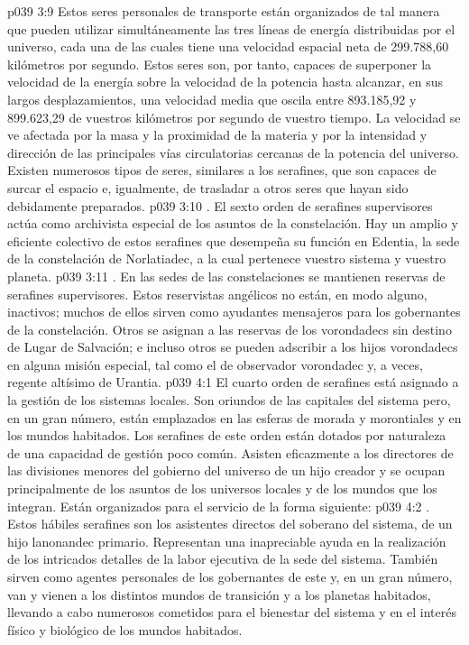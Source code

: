 \vs p039 3:9 Estos seres personales de transporte están organizados de tal manera que pueden utilizar simultáneamente las tres líneas de energía distribuidas por el universo, cada una de las cuales tiene una velocidad espacial neta de 299.788,60 kilómetros por segundo. Estos seres son, por tanto, capaces de superponer la velocidad de la energía sobre la velocidad de la potencia hasta alcanzar, en sus largos desplazamientos, una velocidad media que oscila entre 893.185,92 y 899.623,29 de vuestros kilómetros por segundo de vuestro tiempo. La velocidad se ve afectada por la masa y la proximidad de la materia y por la intensidad y dirección de las principales vías circulatorias cercanas de la potencia del universo. Existen numerosos tipos de seres, similares a los serafines, que son capaces de surcar el espacio e, igualmente, de trasladar a otros seres que hayan sido debidamente preparados.
\vs p039 3:10 . El sexto orden de serafines supervisores actúa como archivista especial de los asuntos de la constelación. Hay un amplio y eficiente colectivo de estos serafines que desempeña su función en Edentia, la sede de la constelación de Norlatiadec, a la cual pertenece vuestro sistema y vuestro planeta.
\vs p039 3:11 . En las sedes de las constelaciones se mantienen reservas de serafines supervisores. Estos reservistas angélicos no están, en modo alguno, inactivos; muchos de ellos sirven como ayudantes mensajeros para los gobernantes de la constelación. Otros se asignan a las reservas de los vorondadecs sin destino de Lugar de Salvación; e incluso otros se pueden adscribir a los hijos vorondadecs en alguna misión especial, tal como el de observador vorondadec y, a veces, regente altísimo de Urantia.
\vs p039 4:1 El cuarto orden de serafines está asignado a la gestión de los sistemas locales. Son oriundos de las capitales del sistema pero, en un gran número, están emplazados en las esferas de morada y morontiales y en los mundos habitados. Los serafines de este orden están dotados por naturaleza de una capacidad de gestión poco común. Asisten eficazmente a los directores de las divisiones menores del gobierno del universo de un hijo creador y se ocupan principalmente de los asuntos de los universos locales y de los mundos que los integran. Están organizados para el servicio de la forma siguiente:
\vs p039 4:2 . Estos hábiles serafines son los asistentes directos del soberano del sistema, de un hijo lanonandec primario. Representan una inapreciable ayuda en la realización de los intricados detalles de la labor ejecutiva de la sede del sistema. También sirven como agentes personales de los gobernantes de este y, en un gran número, van y vienen a los distintos mundos de transición y a los planetas habitados, llevando a cabo numerosos cometidos para el bienestar del sistema y en el interés físico y biológico de los mundos habitados.
